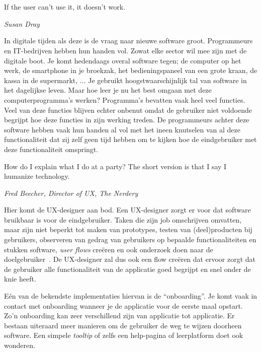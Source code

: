 
\chapter{}
\label{ch:inleiding}

\epigraph{If the user can't use it, it doesn't work.}{\textit{Susan Dray}}

In digitale tijden als deze is de vraag naar nieuwe software groot. Programmeurs en IT-bedrijven hebben hun handen vol. Zowat elke sector wil mee zijn met de digitale boot. Je komt hedendaags overal software tegen; de computer op het werk, de smartphone in je broekzak, het bedieningspaneel van een grote kraan, de kassa in de supermarkt, $\dots$ Je gebruikt hoogstwaarschijnlijk tal van software in het dagelijkse leven. Maar hoe leer je nu het best omgaan met deze computerprogramma's werken? Programma's bevatten vaak heel veel functies. Veel van deze functies blijven echter onbenut omdat de gebruiker niet voldoende begrijpt hoe deze functies in zijn werking treden. De programmeurs achter deze software hebben vaak hun handen al vol met het ineen knutselen van al deze functionaliteit dat zij zelf geen tijd hebben om te kijken hoe de eindgebruiker met deze functionaliteit omspringt.

\epigraph{How do I explain what I do at a party? The short version is that I say I humanize technology.}{\textit{Fred Beecher, Director of UX, The Nerdery}}

Hier komt de UX-designer aan bod. Een UX-designer zorgt er voor dat software bruikbaar is voor de eindgebruiker. Taken die zijn job omschrijven omvatten, maar zijn niet beperkt tot maken van prototypes, testen van (deel)producten bij gebruikers, observeren van gedrag van gebruikers op bepaalde functionaliteiten en stukken software, \textit{user flows} creëren en ook onderzoek doen naar de doelgebruiker~\autocite{White2020}. De UX-designer zal dus ook een flow creëren dat ervoor zorgt dat de gebruiker alle functionaliteit van de applicatie goed begrijpt en snel onder de knie heeft.

Eén van de bekendste implementaties hiervan is de ``onboarding''. Je komt vaak in contact met onboarding wanneer je de applicatie voor de eerste maal opstart. Zo'n onboarding kan zeer verschillend zijn van applicatie tot applicatie.
Er bestaan uiteraard meer manieren om de gebruiker de weg te wijzen doorheen software. Een simpele \textit{tooltip} of zelfs een help-pagina of leerplatform doet ook wonderen.

